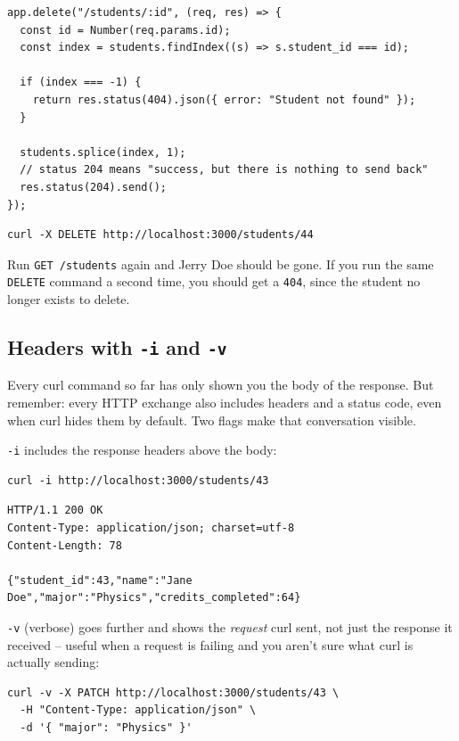 \begin{verbatim}
app.delete("/students/:id", (req, res) => {
  const id = Number(req.params.id);
  const index = students.findIndex((s) => s.student_id === id);
 
  if (index === -1) {
    return res.status(404).json({ error: "Student not found" });
  }
 
  students.splice(index, 1);
  // status 204 means "success, but there is nothing to send back"
  res.status(204).send();
});
\end{verbatim}

\begin{verbatim}
curl -X DELETE http://localhost:3000/students/44
\end{verbatim}

Run \texttt{GET /students} again and Jerry Doe should be gone. If you
run the same \texttt{DELETE} command a second time, you should get a
\texttt{404}, since the student no longer exists to delete.

\subsection{Headers with \texttt{-i} and \texttt{-v}}

Every curl command so far has only shown you the body of the response.
But remember: every HTTP exchange also includes headers and a status
code, even when curl hides them by default. Two flags make that
conversation visible.

\texttt{-i} includes the response headers above the body:

\begin{verbatim}
curl -i http://localhost:3000/students/43
\end{verbatim}

\begin{verbatim}
HTTP/1.1 200 OK
Content-Type: application/json; charset=utf-8
Content-Length: 78
 
{"student_id":43,"name":"Jane Doe","major":"Physics","credits_completed":64}
\end{verbatim}

\texttt{-v} (verbose) goes further and shows the \emph{request} curl
sent, not just the response it received -- useful when a request is
failing and you aren't sure what curl is actually sending:

\begin{verbatim}
curl -v -X PATCH http://localhost:3000/students/43 \
  -H "Content-Type: application/json" \
  -d '{ "major": "Physics" }'
\end{verbatim}


